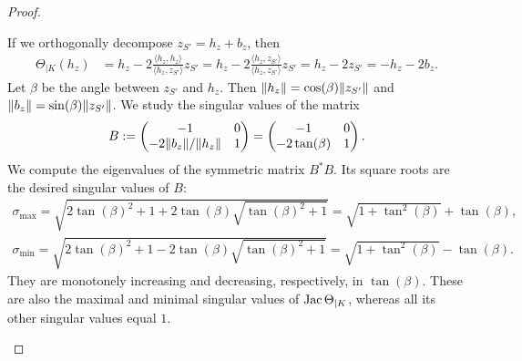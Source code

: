 \documentclass[10pt,a4paper]{article}
\begin{document}
\begin{proof}
\begin{itemize}
        If we orthogonally decompose $z_{S'} = h_{z} + b_{z}$, then 
        \begin{align*}
            \Theta_{|K}( h_{z} ) 
            &= 
            h_{z}
            - 
            2 \frac{\langle h_{z}, h_{z} \rangle}{\langle h_{z}, z_{S'} \rangle} z_{S'}
            = 
            h_{z}
            - 
            2 \frac{\langle h_{z}, z_{S'} \rangle}{\langle h_{z}, z_{S'} \rangle} z_{S'}
            = 
            h_{z}
            - 
            2 z_{S'}
            = 
            - h_{z}
            - 
            2 b_{z}
            .
        \end{align*}
        Let $\beta$ be the angle between $z_{S'}$ and $h_{z}$. 
        Then $\|  h_{z}  \| = \cos(\beta) \|  z_{S'}  \|$ and $\|  b_{z}  \| = \sin(\beta) \|  z_{S'}  \|$. 
        We study the singular values of the matrix 
        \begin{align*}
            B 
            := 
            \begin{pmatrix}
            -1                 & 0
            \\ 
            -2 \|  b_{z}  \|/\|  h_{z}  \| & 1
            \end{pmatrix}
            =
            \begin{pmatrix}
            -1             & 0
            \\ 
            -2 \tan(\beta) & 1
            \end{pmatrix}
            .
        \end{align*}
        We compute the eigenvalues of the symmetric matrix $B^{\ast} B$. 
        Its square roots are the desired singular values of $B$:
        \begin{align*}
            \sigma_{\max} = \sqrt{ 2\tan(\beta)^2 + 1 + 2 \tan(\beta) \sqrt{ \tan(\beta)^2 + 1 } } = \sqrt{ 1 + \tan^{2}(\beta) } + \tan(\beta)
            ,
            \\
            \sigma_{\min} = \sqrt{ 2\tan(\beta)^2 + 1 - 2 \tan(\beta) \sqrt{ \tan(\beta)^2 + 1 } } = \sqrt{ 1 + \tan^{2}(\beta) } - \tan(\beta)
            .
        \end{align*}
        They are monotonely increasing and decreasing, respectively, in $\tan(\beta)$. 
        These are also the maximal and minimal singular values of $\operatorname{{\rm Jac}}\Theta_{|K}$,
        whereas all its other singular values equal $1$. 
        

\end{itemize}
\end{proof}
\end{document}
